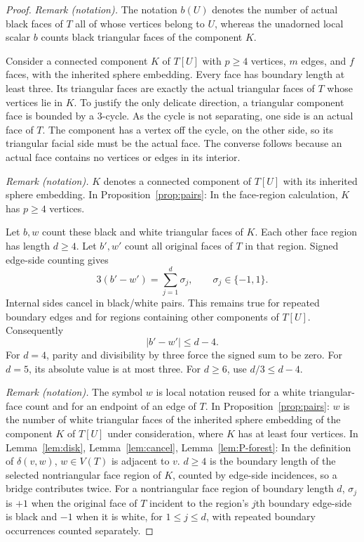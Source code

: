 \documentclass[11pt]{article}
\theoremstyle{remark}
\numberwithin{equation}{section}
\begin{document}
\begin{proof}
\noindent\textit{Remark (notation).} The notation $b(U)$ denotes the number of actual black faces of $T$ all of whose vertices belong to $U$, whereas the unadorned local scalar $b$ counts black triangular faces of the component $K$.


Consider a connected component \(K\) of \(T[U]\) with \(p\ge4\)
vertices, \(m\) edges, and \(f\) faces, with the inherited
sphere embedding. Every face has boundary length at least three.
Its triangular faces are exactly the actual triangular faces
of \(T\) whose vertices lie in \(K\). To justify the only
delicate direction, a triangular component face is bounded
by a \(3\)-cycle. As the cycle is not separating, one side is
an actual face of \(T\). The component has a vertex off the
cycle, on the other side, so its triangular facial side must
be the actual face. The converse follows because an actual
face contains no vertices or edges in its interior.

\noindent\textit{Remark (notation).} $K$ denotes a connected component of $T[U]$ with its inherited sphere embedding. In Proposition~\ref{prop:pairs}: In the face-region calculation, $K$ has $p\ge4$ vertices.


Let \(b,w\) count these black and white triangular faces of
\(K\). Each other face region has length \(d\ge4\). Let
\(b',w'\) count all original faces of \(T\) in that region.
Signed edge-side counting gives
\[
 3(b'-w')=\sum_{j=1}^{d}\sigma_j,\qquad
 \sigma_j\in\{-1,1\}.
\]
Internal sides cancel in black/white pairs. This remains true
for repeated boundary edges and for regions containing other
components of \(T[U]\). Consequently
\begin{equation}\label{eq:face-defect}
 \lvert b'-w'\rvert\le d-4.
\end{equation}
For \(d=4\), parity and divisibility by three force the signed
sum to be zero. For \(d=5\), its absolute value is at most
three. For \(d\ge6\), use \(d/3\le d-4\).

\noindent\textit{Remark (notation).} The symbol $w$ is local notation reused for a white triangular-face count and for an endpoint of an edge of $T$. In Proposition~\ref{prop:pairs}: $w$ is the number of white triangular faces of the inherited sphere embedding of the component $K$ of $T[U]$ under consideration, where $K$ has at least four vertices. In Lemma~\ref{lem:disk}, Lemma~\ref{lem:cancel}, Lemma~\ref{lem:P-forest}: In the definition of $\delta(v,w)$, $w\in V(T)$ is adjacent to $v$. $d\ge4$ is the boundary length of the selected nontriangular face region of $K$, counted by edge-side incidences, so a bridge contributes twice. For a nontriangular face region of boundary length $d$, $\sigma_j$ is $+1$ when the original face of $T$ incident to the region's $j$th boundary edge-side is black and $-1$ when it is white, for $1\le j\le d$, with repeated boundary occurrences counted separately.



\end{proof}
\end{document}
